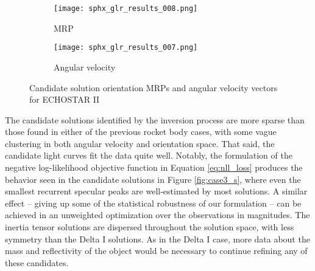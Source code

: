 \documentclass[a4paper,twocolumn]{spaceDebrisC} %
\newcommand{\figmed}[0]{0.4\textwidth}
\begin{document}
\begin{figure}[H]
  \centering
  \begin{subfigure}[t]{0.23\textwidth}
    \centering
    \texttt{[image: sphx\_glr\_results\_008.png]}
    \caption{MRP}
    \label{fig:case3_pwa}
  \end{subfigure}
  \hfill
  \begin{subfigure}[t]{0.23\textwidth}
    \centering
    \texttt{[image: sphx\_glr\_results\_007.png]}
    \caption{Angular velocity}
    \label{fig:case3_pwb}
  \end{subfigure}

  \caption{Candidate solution orientation MRPs and angular velocity vectors for ECHOSTAR II}
  \label{fig:case3_pw}
\end{figure}




The candidate solutions identified by the inversion process are more sparse than those found in either of the previous rocket body cases, with some vague clustering in both angular velocity and orientation space. That said, the candidate light curves fit the data quite well. Notably, the formulation of the negative log-likelihood objective function in Equation \ref{eq:nll_loss} produces the behavior seen in the candidate solutions in Figure \ref{fig:case3_s}, where even the smallest recurrent specular peaks are well-estimated by most solutions. A similar effect -- giving up some of the statistical robustness of our formulation -- can be achieved in an unweighted optimization over the observations in magnitudes. The inertia tensor solutions are dispersed throughout the solution space, with less symmetry than the Delta I solutions. As in the Delta I case, more data about the mass and reflectivity of the object would be necessary to continue refining any of these candidates.
\end{document}
